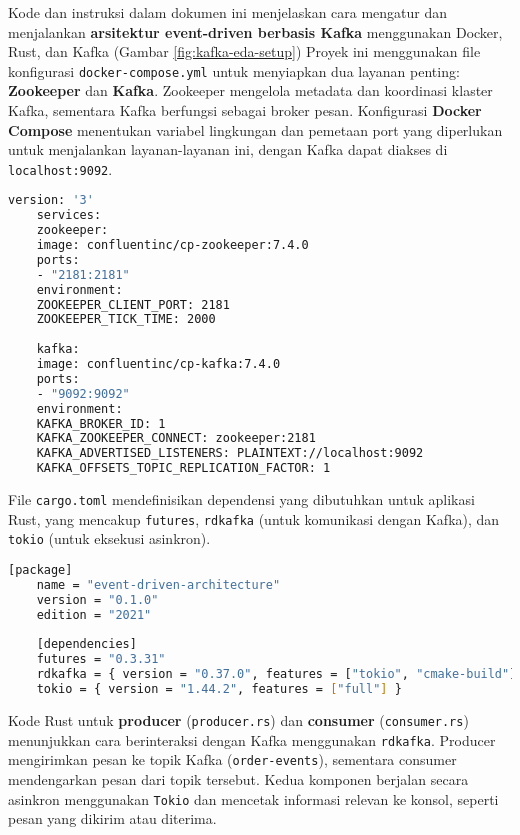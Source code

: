 Kode dan instruksi dalam dokumen ini menjelaskan cara mengatur dan menjalankan \textbf{arsitektur event-driven berbasis Kafka} menggunakan Docker, Rust, dan Kafka (Gambar \ref{fig:kafka-eda-setup}) Proyek ini menggunakan file konfigurasi \texttt{docker-compose.yml} untuk menyiapkan dua layanan penting: \textbf{Zookeeper} dan \textbf{Kafka}. Zookeeper mengelola metadata dan koordinasi klaster Kafka, sementara Kafka berfungsi sebagai broker pesan. Konfigurasi \textbf{Docker Compose} menentukan variabel lingkungan dan pemetaan port yang diperlukan untuk menjalankan layanan-layanan ini, dengan Kafka dapat diakses di \texttt{localhost:9092}.


\begin{lstlisting}[language=bash, caption={docker-compose.yml}]
	version: '3'
	services:
	zookeeper:
	image: confluentinc/cp-zookeeper:7.4.0
	ports:
	- "2181:2181"
	environment:
	ZOOKEEPER_CLIENT_PORT: 2181
	ZOOKEEPER_TICK_TIME: 2000
	
	kafka:
	image: confluentinc/cp-kafka:7.4.0
	ports:
	- "9092:9092"
	environment:
	KAFKA_BROKER_ID: 1
	KAFKA_ZOOKEEPER_CONNECT: zookeeper:2181
	KAFKA_ADVERTISED_LISTENERS: PLAINTEXT://localhost:9092
	KAFKA_OFFSETS_TOPIC_REPLICATION_FACTOR: 1
\end{lstlisting}

File \texttt{cargo.toml} mendefinisikan dependensi yang dibutuhkan untuk aplikasi Rust, yang mencakup \texttt{futures}, \texttt{rdkafka} (untuk komunikasi dengan Kafka), dan \texttt{tokio} (untuk eksekusi asinkron).

\begin{lstlisting}[language=bash, caption={cargo.toml}]
	[package]
	name = "event-driven-architecture"
	version = "0.1.0"
	edition = "2021"
	
	[dependencies]
	futures = "0.3.31"
	rdkafka = { version = "0.37.0", features = ["tokio", "cmake-build"] }
	tokio = { version = "1.44.2", features = ["full"] }
\end{lstlisting}

Kode Rust untuk \textbf{producer} (\texttt{producer.rs}) dan \textbf{consumer} (\texttt{consumer.rs}) menunjukkan cara berinteraksi dengan Kafka menggunakan \texttt{rdkafka}. Producer mengirimkan pesan ke topik Kafka (\texttt{order-events}), sementara consumer mendengarkan pesan dari topik tersebut. Kedua komponen berjalan secara asinkron menggunakan \texttt{Tokio} dan mencetak informasi relevan ke konsol, seperti pesan yang dikirim atau diterima.


